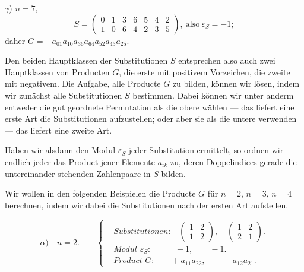 \documentclass[11pt]{article}
\providecommand{\weberpage}[1]{}
\begin{document}
$\gamma$) $n = 7$,
\[
S = \begin{pmatrix} 0 & 1 & 3 & 6 & 5 & 4 & 2 \\ 1 & 0 & 6 & 4 & 2 & 3 & 5 \end{pmatrix}, \ \text{also} \ \varepsilon_S = -1;
\]
daher $G = -a_{01} a_{10} a_{36} a_{64} a_{52} a_{43} a_{25}$.

Den beiden Hauptklassen der Substitutionen $S$ entsprechen also auch zwei Hauptklassen von Producten $G$, die erste mit positivem Vorzeichen, die zweite mit negativem. Die Aufgabe, alle Producte $G$ zu bilden, können wir lösen, indem wir zunächst alle Substitutionen $S$ bestimmen. Dabei können wir unter anderm entweder die gut geordnete Permutation als die obere wählen — das liefert eine erste Art die Substitutionen aufzustellen; oder aber sie als die untere verwenden — das liefert eine zweite Art.

Haben wir alsdann den Modul $\varepsilon_S$ jeder Substitution ermittelt, so ordnen wir endlich jeder das Product jener Elemente $a_{ik}$ zu, deren Doppelindices gerade die untereinander stehenden Zahlenpaare in $S$ bilden.

Wir wollen in den folgenden Beispielen die Producte $G$ für $n = 2$, $n = 3$, $n = 4$ berechnen, indem wir dabei die Substitutionen nach der ersten Art aufstellen.


\weberpage{17}

\[
\alpha)\quad n = 2.
\qquad
\left\{
\begin{aligned}
&\textit{Substitutionen:}\quad \begin{pmatrix}1 & 2\\ 1 & 2\end{pmatrix}, \quad \begin{pmatrix}1 & 2\\ 2 & 1\end{pmatrix}.\\[4pt]
&\textit{Modul } \varepsilon_S\textit{:} \qquad\quad {}+1, \qquad -1.\\[4pt]
&\textit{Product } G\textit{:} \qquad {}+a_{11}a_{22}, \qquad -a_{12}a_{21}.
\end{aligned}
\right.
\]
\end{document}
